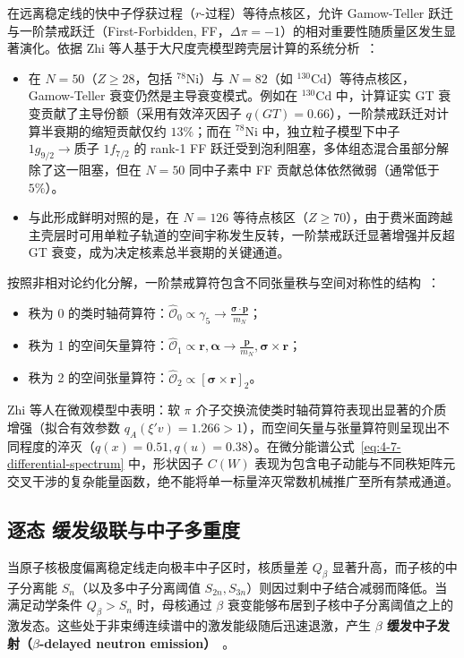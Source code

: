 在远离稳定线的快中子俘获过程（$r$-过程）等待点核区，允许 Gamow-Teller 跃迁与一阶禁戒跃迁（First-Forbidden, FF，$\Delta \pi = -1$）的相对重要性随质量区发生显著演化。依据 Zhi 等人基于大尺度壳模型跨壳层计算的系统分析~\cite{doctoral-r1-g34-zhi-2013-prc-shell-model-half-lives}：
\begin{itemize}
\item 在 $N=50$（$Z \ge 28$，包括 $^{78}\mathrm{Ni}$）与 $N=82$（如 $^{130}\mathrm{Cd}$）等待点核区，Gamow-Teller 衰变仍然是主导衰变模式。例如在 $^{130}\mathrm{Cd}$ 中，计算证实 GT 衰变贡献了主导份额（采用有效淬灭因子 $q(GT) = 0.66$），一阶禁戒跃迁对计算半衰期的缩短贡献仅约 $13\%$；而在 $^{78}\mathrm{Ni}$ 中，独立粒子模型下中子 $1g_{9/2} \to \text{质子 } 1f_{7/2}$ 的 rank-1 FF 跃迁受到泡利阻塞，多体组态混合虽部分解除了这一阻塞，但在 $N=50$ 同中子素中 FF 贡献总体依然微弱（通常低于 $5\%$）。
\item 与此形成鲜明对照的是，在 $N=126$ 等待点核区（$Z \ge 70$），由于费米面跨越主壳层时可用单粒子轨道的空间宇称发生反转，一阶禁戒跃迁显著增强并反超 GT 衰变，成为决定核素总半衰期的关键通道。
\end{itemize}
按照非相对论约化分解，一阶禁戒算符包含不同张量秩与空间对称性的结构~\cite{doctoral-r1-g34-zhi-2013-prc-shell-model-half-lives}：
\begin{itemize}
\item 秩为 0 的类时轴荷算符：$\hat{\mathcal{O}}_0 \propto \gamma_5 \to \frac{\boldsymbol{\sigma} \cdot \mathbf{p}}{m_N}$；
\item 秩为 1 的空间矢量算符：$\hat{\mathcal{O}}_1 \propto \mathbf{r}, \boldsymbol{\alpha} \to \frac{\mathbf{p}}{m_N}, \boldsymbol{\sigma}\times\mathbf{r}$；
\item 秩为 2 的空间张量算符：$\hat{\mathcal{O}}_2 \propto [\boldsymbol{\sigma} \times \mathbf{r}]_2$。
\end{itemize}
Zhi 等人在微观模型中表明：软 $\pi$ 介子交换流使类时轴荷算符表现出显著的介质增强（拟合有效参数 $q_A(\xi' v) = 1.266 > 1$），而空间矢量与张量算符则呈现出不同程度的淬灭（$q(x) = 0.51, q(u) = 0.38$）。在微分能谱公式~\eqref{eq:4-7-differential-spectrum} 中，形状因子 $C(W)$ 表现为包含电子动能与不同秩矩阵元交叉干涉的复杂能量函数，绝不能将单一标量淬灭常数机械推广至所有禁戒通道。

\subsection{逐态 \beta 缓发级联与中子多重度}\label{sec:4-7-2}

当原子核极度偏离稳定线走向极丰中子区时，核质量差 $Q_\beta$ 显著升高，而子核的中子分离能 $S_n$（以及多中子分离阈值 $S_{2n}, S_{3n}$）则因过剩中子结合减弱而降低。当满足动学条件 $Q_\beta > S_n$ 时，母核通过 $\beta$ 衰变能够布居到子核中子分离阈值之上的激发态。这些处于非束缚连续谱中的激发能级随后迅速退激，产生 \textbf{$\beta$ 缓发中子发射（$\beta$-delayed neutron emission）}~\cite{dimitriou-2021-iaea-beta-delayed-neutron-database}。

